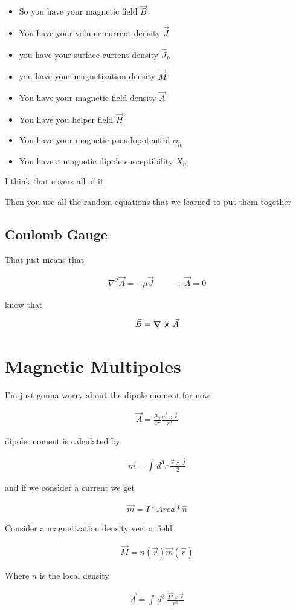 \documentclass[fleqn]{report}
\newcommand{\hp}{\hspace{1cm}}
\newcommand{\equations} [1] {
\begin{gather*}
#1
\end{gather*}
}
\begin{document}
\begin{itemize}
    \item 
    So you have your magnetic field $\vec B$ 
    \item 
    You have your volume current density $\vec J$
    \item 
    you have your surface current density $\vec J_b$ 
    \item 
    you have your magnetization density $\vec M$ 
    \item 
    You have your magnetic field density $\vec A$ 
    \item 
    You have you helper field $\vec H$ 
    \item 
    You have your magnetic pseudopotential $\phi_m$
    \item 
    You have a magnetic dipole susceptibility $X_m$
\end{itemize}

I think that covers all of it. 

Then you use all the random equations that we learned to 
put them together 

\subsection{Coulomb Gauge}
That just means that 
\equations{
    \nabla^2 \vec A = - \mu \vec J
    \hp 
    \div \vec A = 0
}

know that 
\equations{
    \vec B 
    =
    \curl \vec A 
}

\section{Magnetic Multipoles}
I'm just gonna worry about the dipole moment for now 

\equations{
    \vec A 
    =
    \frac{\mu_0}{4 \pi}
    \frac{\vec m \times \vec r }{r^3}
}

dipole moment is calculated by 
\equations{
    \vec m 
    =
    \int \, d^3 r \, 
    \frac{\vec r \times \vec J}{2}
}

and if we consider a current we get 
\equations{
    \vec m 
    =
    I * Area * \hat n
}

Consider a magnetization density vector field 
\equations{
    \vec M 
    =
    n(\vec r) 
    \vec m(\vec r)
}
Where $n$ is the local density 

\equations{
    \vec A 
    =
    \int \, d^3 \, 
    \frac{\vec M \times \vec r}{r^3}
}
\end{document}
